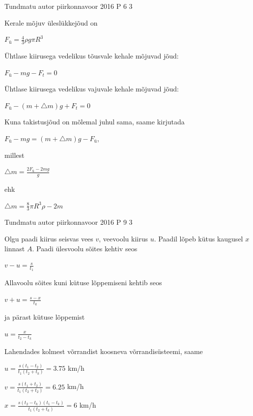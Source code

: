 \documentclass[11pt]{article}
\begin{document}
{%
{Tundmatu autor} %
{piirkonnavoor} %
{2016} %
{P 6} %
{3} %
{

\ifSolution
Kerale mõjuv üleslükkejõud on 
\begin{center}
${F_ü} = \frac{4}{3} \rho g \pi R^3$
\end{center}
Ühtlase kiirusega vedelikus tõusvale kehale mõjuvad jõud:
\begin{center}
${F_ü} - mg - F_t = 0$
\end{center}
Ühtlase kiirusega vedelikus vajuvale kehale mõjuvad jõud:
\begin{center}
${F_ü} - (m + \triangle m)g + F_t = 0$
\end{center}
Kuna takistusjõud on mõlemal juhul sama, saame kirjutada
\begin{center}
${F_ü} - mg = (m + \triangle m)g - F_ü$,
\end{center}
millest
\begin{center}
$\triangle m = \frac{2{F_ü} - 2mg}{g}$
\end{center}
ehk
\begin{center}
$\triangle m = \frac{8}{3}\pi R^3 \rho - 2m$
\end{center}
\fi
}

{Tundmatu autor} %
{piirkonnavoor} %
{2016} %
{P 9} %
{3} %
{

\ifSolution
Olgu paadi kiirus seisvas vees $v$, veevoolu kiirus $u$. Paadil lõpeb kütus kaugusel $x$ linnast $A$.
\newline
Paadi ülesvoolu sõites kehtiv seos
\begin{center}
$ v - u = \frac {s}{t_1}$
\end{center}
Allavoolu sõites kuni kütuse lõppemiseni kehtib seos
\begin{center}
$ v + u = \frac{s-x}{t_k}$
\end{center}
ja pärast kütuse lõppemist
\begin{center}
$u = \frac {x}{t_2 - t_k}$
\end{center}
Lahendades kolmest võrrandist koosneva võrrandisüsteemi, saame
\begin{center}
$u = \frac{s(t_1 - t_2)}{t_1(t_2 + t_k)} = 3.75$ km/h
\end{center}
\begin{center}
$v = \frac {s(t_1 + t_2)}{t_1(t_2 + t_2)} = 6.25$ km/h
\end{center}
\begin{center}
$x = \frac{s(t_2-t_k)(t_1-t_k)}{t_1(t_2 + t_k)} = 6$ km/h
\end{center}
\fi
}

}
\end{document}

